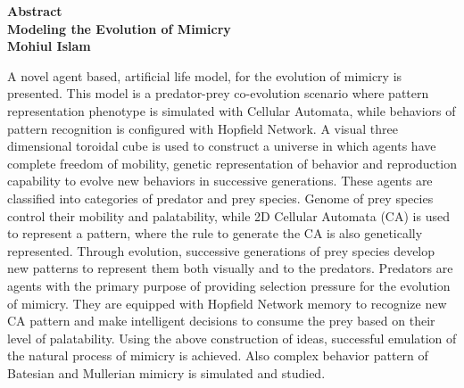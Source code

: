 \newpage
{}
\label{abstract}
\begin{center}

\Large \textbf{Abstract}\\[0.5cm]
\large \textbf{Modeling the Evolution of Mimicry}\\
\small \textbf{Mohiul Islam}\\

\end{center}

A novel agent based, artificial life model, for the evolution of mimicry is presented. This model is a predator-prey co-evolution scenario where pattern representation phenotype is simulated with Cellular Automata, while behaviors of pattern recognition is configured with Hopfield Network. A visual three dimensional toroidal cube is used to construct a universe in which agents have complete freedom of mobility, genetic representation of behavior and reproduction capability to evolve new behaviors in successive generations. These agents are classified into categories of predator and prey species. Genome of prey species control their mobility and palatability, while 2D Cellular Automata (CA) is used to represent a pattern, where the rule to generate the CA is also genetically represented. Through evolution, successive generations of prey species develop new patterns to represent them both visually and to the predators. Predators are agents with the primary purpose of providing selection pressure for the evolution of mimicry. They are equipped with Hopfield Network memory to recognize new CA pattern and make intelligent decisions to consume the prey based on their level of palatability. Using the above construction of ideas, successful emulation of the natural process of mimicry is achieved. Also complex behavior pattern of Batesian and Mullerian mimicry is simulated and studied.

\setcounter{page}{3}
